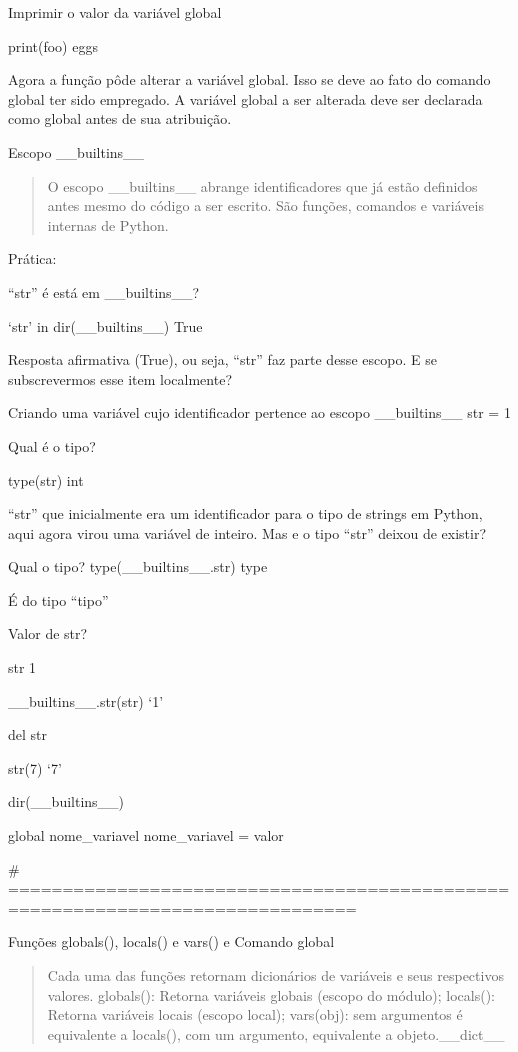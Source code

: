 \documentclass[letterpaper,10pt,brazil]{sphinxmanual}
\begin{document}
Imprimir o valor da variável global

print(foo)
eggs

Agora a função pôde alterar a variável global.
Isso se deve ao fato do comando global ter sido empregado.
A variável global a ser alterada deve ser declarada como global antes de sua
atribuição.

Escopo \_\_builtins\_\_
\begin{quote}

O escopo \_\_builtins\_\_ abrange identificadores que já estão definidos antes mesmo do código a ser escrito.
São funções, comandos e variáveis internas de Python.
\end{quote}

Prática:

“str” é está em \_\_builtins\_\_?

‘str’ in dir(\_\_builtins\_\_)
True

Resposta afirmativa (True), ou seja, “str” faz parte desse escopo.
E se subscrevermos esse item localmente?

Criando uma variável cujo identificador pertence ao escopo \_\_builtins\_\_
str = 1

Qual é o tipo?

type(str)
int

“str” que inicialmente era um identificador para o tipo de strings em Python,
aqui agora virou uma variável de inteiro.
Mas e o tipo “str” deixou de existir?

Qual o tipo?
type(\_\_builtins\_\_.str)
type

É do tipo “tipo”

Valor de str?

str
1

\_\_builtins\_\_.str(str)
‘1’

del str

str(7)
‘7’

dir(\_\_builtins\_\_)

global nome\_variavel
nome\_variavel = valor

\# ==============================================================================

Funções globals(), locals() e vars() e Comando global
\begin{quote}

Cada uma das funções retornam dicionários de variáveis e seus respectivos valores.
globals(): Retorna variáveis globais (escopo do módulo);
locals(): Retorna variáveis locais (escopo local);
vars(obj): sem argumentos é equivalente a locals(), com um argumento, equivalente a objeto.\_\_dict\_\_
\end{quote}
\end{document}
